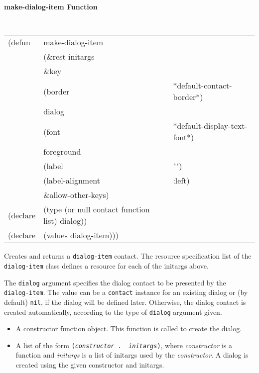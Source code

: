 {\samepage
{\large {\bf make-dialog-item \hfill Function}} 
\begin{flushright} \parbox[t]{6.125in}{
\tt
\begin{tabular}{lll}
\raggedright
(defun & make-dialog-item \\
       & (\&rest initargs \\
       & \&key  \\
       & (border                & *default-contact-border*) \\ 
       & dialog       &  \\   
       & (font                  & *default-display-text-font*) \\ 
       & foreground \\
       & (label                 & "") \\ 
       & (label-alignment       & :left) \\   
       &   \&allow-other-keys) \\
(declare &(type (or null contact function list) dialog))\\
(declare & (values   dialog-item)))
\end{tabular}
\rm

}\end{flushright}}

\begin{flushright} \parbox[t]{6.125in}{
Creates and returns a {\tt dialog-item} contact.
The resource specification list of the {\tt dialog-item} class defines
a resource for each of the initargs above.

The {\tt dialog} argument specifies the dialog contact to be presented by the {\tt
dialog-item}. The value can be a {\tt contact} instance for an existing dialog
or (by default) {\tt nil}, if the dialog will be defined later. Otherwise, the
dialog contact is created automatically, according to the type of {\tt dialog}
argument given.  

\begin{itemize}
\item A constructor function object. This function is called to create the dialog.

\item A list of the form {\tt ({\em constructor} .  {\em
initargs})}, where {\em constructor} is a function and {\em initargs}
is a list of initargs used by the {\em
constructor}. A dialog is created using the given constructor and initargs.

\end{itemize}

}\end{flushright}

